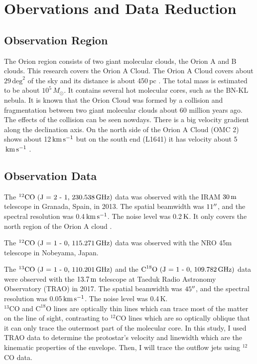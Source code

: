 \section{Obervations and Data Reduction}

\subsection{Observation Region}
The Orion region consists of two giant molecular clouds, the Orion A and B clouds. This research covers the Orion A Cloud. The Orion A Cloud covers about $29 \, \textrm{deg}^2$ of the sky and its distance is about 450$\,$pc \cite{kounkel2017gould}. The total mass is estimated to be about $10^5 \, M_{\odot}$. It contains several hot molecular cores, such as the BN-KL nebula. It is known that the Orion Cloud was formed by a collision and fragmentation between two giant molecular clouds about 60 million years ago. The effects of the collision can be seen nowdays. There is a big velocity gradient along the declination axis. On the north side of the Orion A Cloud (OMC 2) shows about 12$\, \rm km\,s^{-1}$ but on the south end (L1641) it has velocity about 5$\, \rm km\,s^{-1}$ \cite{schulz2012formation}.

\subsection{Observation Data}
The $^{12}\textrm{CO (J = 2 - 1, 230.538\,GHz)}$ data was observed with the IRAM $\textrm{30\,m}$ telescope in Granada, Spain, in 2013. The spatial beamwidth was $\textrm 11^{\prime\prime}$, and the spectral resolution was 0.4$\, \rm km\,s^{-1}$. The noise level was 0.2$\, \rm K$. It only covers the north region of the Orion A cloud \cite{berne2014iram}.

The $^{12}\textrm{CO (J = 1 - 0, 115.271\,GHz})$ data was observed with the NRO 45m telescope in Nobeyama, Japan.

The $^{13}\textrm{CO (J = 1 - 0, 110.201\,GHz})$ and the $\textrm{C}^{18}\textrm{O (J = 1 - 0, 109.782\,GHz})$ data were observed with the $\textrm{13.7\,m}$ telescope at Taeduk Radio Astronomy Observatory (TRAO) in 2017. The spatial beamwidth was $\textrm 45^{\prime\prime}$, and the spectral resolution was 0.05$\, \rm km\,s^{-1}$. The noise level was 0.4$\,$K.\\
$^{13}\textrm{CO}$ and $\textrm{C}^{18}\textrm{O}$ lines are optically thin lines which can trace most of the matter on the line of sight, contrasting to $^{12}\textrm{CO}$ lines which are so optically oblique that it can only trace the outermost part of the molecular core. In this study, I used TRAO data to determine the protostar's velocity and linewidth which are the kinematic properties of the envelope. Then, I will trace the outflow jets using $^{12}$CO data.

